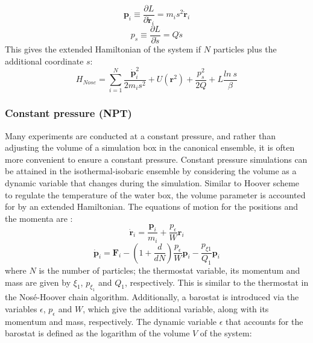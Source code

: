 %
%
\begin{equation}
\mathbf{p}_{i} \equiv \frac{\partial L}{\partial \dot{\mathbf{r}}_{i}} = m_{i} s^{2} \dot{\mathbf{r}}_{i}
\end{equation}
%
%
\begin{equation}
p_{s} \equiv \frac{\partial L}{\partial \dot{s}} = Q \dot{s}
\end{equation}
%
%
This gives the extended Hamiltonian of the system if $N$ particles plus the additional coordinate $s$:
%
%
\begin{equation}
H_{Nose} = \sum_{i=1}^{N} \frac{\mathbf{\dot{p}}_{i}^{2} }{2 m_{i} s^{2} } + U \left( \mathbf{r}^{2} \right) + \frac{p_{s}^{2}}{2Q} + L \frac{ln \: s}{\beta}
\end{equation}

\subsubsection{Constant pressure (NPT)}
Many experiments are conducted at a constant pressure, and rather than adjusting the volume of a simulation box in the canonical ensemble, it is often more convenient to ensure a constant pressure. Constant pressure simulations can be attained in the isothermal-isobaric ensemble by considering the volume as a dynamic variable that changes during the simulation. Similar to Hoover scheme to regulate the temperature of the water box, the volume parameter is accounted for by an extended Hamiltonian. The equations of motion for the positions and the momenta are \cite{Martyna:1994aa}:
%
%
\begin{equation}
\mathbf{\dot{r}}_{i} = \frac{\mathbf{p}_{i}}{m_{i}} + \frac{p_{\epsilon}}{W} \mathbf{r}_{i}
\end{equation}
%
%
\begin{equation}
\mathbf{\dot{p}}_{i} = \mathbf{F}_{i} - \left( 1 + \frac{d}{dN} \right) \frac{p_{\epsilon}}{W} \mathbf{p}_{i} - \frac{p_{\xi 1}}{Q_{1}} \mathbf{p}_{i} 
\end{equation}
%
%
where $N$ is the number of particles; the thermostat variable, its momentum and mass are given by $\xi_{1}$, $p_{\xi_1}$ and $Q_{1}$, respectively. This is similar to the thermostat in the Nos\'{e}-Hoover chain algorithm. Additionally, a barostat is introduced via the variables $\epsilon$, $p_{\epsilon}$ and $W$, which give the additional variable, along with its momentum and mass, respectively. The dynamic variable $\epsilon$ that accounts for the barostat is defined as the logarithm of the volume $V$ of the system:
